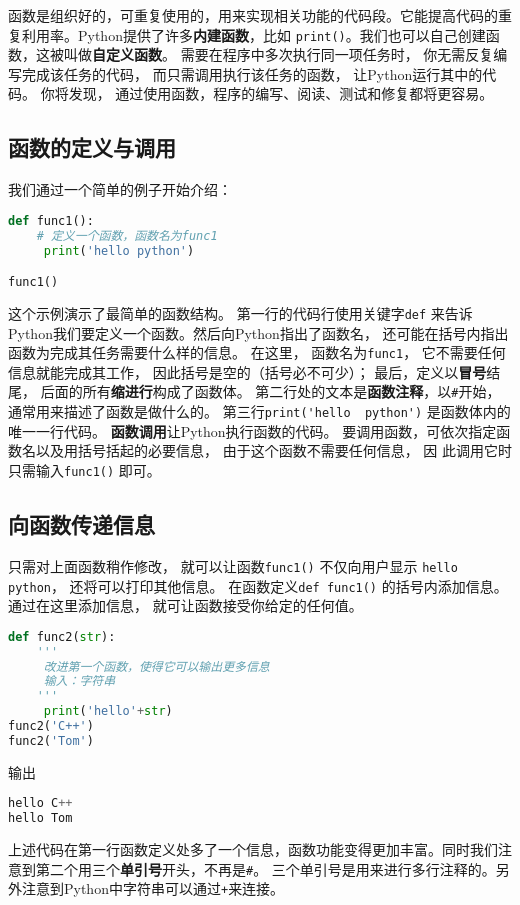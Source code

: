 

函数是组织好的，可重复使用的，用来实现相关功能的代码段。它能提高代码的重复利用率。Python提供了许多\textbf{内建函数}，比如 \verb|print()|。我们也可以自己创建函数，这被叫做\textbf{自定义函数}。 需要在程序中多次执行同一项任务时， 你无需反复编写完成该任务的代码， 而只需调用执行该任务的函数， 让Python运行其中的代码。 你将发现， 通过使用函数，程序的编写、阅读、测试和修复都将更容易。

\subsection{函数的定义与调用}
我们通过一个简单的例子开始介绍：
\begin{lstlisting}[language=python]
def func1():
    # 定义一个函数，函数名为func1
     print('hello python')

func1()
\end{lstlisting}
这个示例演示了最简单的函数结构。 第一行的代码行使用关键字\verb|def| 来告诉Python我们要定义一个函数。然后向Python指出了函数名， 还可能在括号内指出函数为完成其任务需要什么样的信息。 在这里， 函数名为\verb|func1|， 它不需要任何信息就能完成其工作， 因此括号是空的（括号必不可少）； 最后，定义以\textbf{冒号}结尾， 后面的所有\textbf{缩进行}构成了函数体。 第二行处的文本是\textbf{函数注释}，以\verb|#|开始，通常用来描述了函数是做什么的。
第三行\verb|print('hello  python')| 是函数体内的唯一一行代码。
\textbf{函数调用}让Python执行函数的代码。 要调用函数，可依次指定函数名以及用括号括起的必要信息， 由于这个函数不需要任何信息， 因
此调用它时只需输入\verb|func1()| 即可。

\subsection{向函数传递信息}
只需对上面函数稍作修改， 就可以让函数\verb|func1()| 不仅向用户显示 \verb|hello python|， 还将可以打印其他信息。 在函数定义\verb|def func1()| 的括号内添加信息。 通过在这里添加信息， 就可让函数接受你给定的任何值。
\begin{lstlisting}[language=python]
def func2(str):
    '''
     改进第一个函数，使得它可以输出更多信息
     输入：字符串
    '''
     print('hello'+str)
func2('C++')
func2('Tom')
\end{lstlisting}
输出
\begin{lstlisting}[language=python]
hello C++
hello Tom
\end{lstlisting}
上述代码在第一行函数定义处多了一个信息，函数功能变得更加丰富。同时我们注意到第二个用三个\textbf{单引号}开头，不再是\verb|#|。 三个单引号是用来进行多行注释的。另外注意到Python中字符串可以通过\verb|+|来连接。

